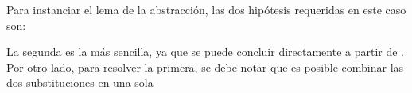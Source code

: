 \documentclass[]{report}
\begin{document}
	Para instanciar el lema de la abstracción, las dos hipótesis requeridas en este caso son:
	
	\snstar
	\AgdaSymbol{(}\AgdaSpace{}%
	\AgdaSpace{}%
	\AgdaSpace{}%
	\AgdaSymbol{(}\AgdaSpace{}%
	\AgdaSpace{}%
	\AgdaSymbol{)}\AgdaSpace{}%
	\AgdaSpace{}%
	\AgdaSymbol{(}\AgdaSpace{}%
	\AgdaOperator{\AgdaInductiveConstructor{[}}\AgdaSpace{}%
	\AgdaSpace{}%
	\AgdaOperator{\AgdaInductiveConstructor{]≡}}\AgdaSpace{}%
	\AgdaSymbol{(}\AgdaSpace{}%
	\AgdaSymbol{)}\AgdaSpace{}%
	\AgdaSpace{}%
	\AgdaSymbol{(}\AgdaSpace{}%
	\AgdaSpace{}%
	\AgdaSymbol{)}
	\AgdaSpace{}%
	\AgdaSymbol{))}
	
	\snstar
	\AgdaSymbol{(}\AgdaSpace{}%
	\AgdaOperator{\AgdaInductiveConstructor{[}}\AgdaSpace{}%
	\AgdaSpace{}%
	\AgdaOperator{\AgdaInductiveConstructor{]≡}}\AgdaSpace{}%
	\AgdaSymbol{(}\AgdaSpace{}%
	\AgdaSymbol{)}\AgdaSpace{}%
	\AgdaSpace{}%
	\AgdaSymbol{(}\AgdaSpace{}%
	\AgdaSpace{}%
	\AgdaSymbol{)}
	\AgdaSpace{}%
	\AgdaSymbol{)}
	
	La segunda es la más sencilla, ya que se puede concluir directamente a partir de .
	Por otro lado, para resolver la primera, se debe notar que es posible combinar las dos substituciones en una sola 
	\AgdaSpace{}%
	\AgdaSymbol{(}\AgdaOperator{\AgdaInductiveConstructor{[}}\AgdaSpace{}%
	\AgdaSpace{}%
	\AgdaOperator{\AgdaInductiveConstructor{]≡}}\AgdaSpace{}%
	\AgdaSymbol{)}\AgdaSpace{}%
	\AgdaSpace{}%
	\AgdaSpace{}%
	\AgdaSpace{}%
	\AgdaSpace{}%
	\AgdaSpace{}%
	
	
\end{document}
